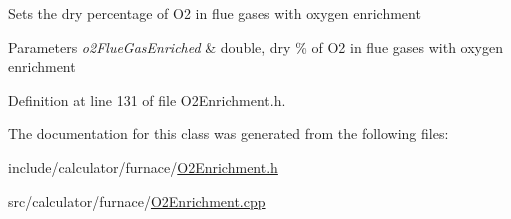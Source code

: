 Sets the dry percentage of O2 in flue gases with oxygen enrichment 
\begin{DoxyParams}{Parameters}
{\em o2\+Flue\+Gas\+Enriched} & double, dry \% of O2 in flue gases with oxygen enrichment \\
\hline
\end{DoxyParams}


Definition at line 131 of file O2\+Enrichment.\+h.



The documentation for this class was generated from the following files\+:\begin{DoxyCompactItemize}
\item 
include/calculator/furnace/\hyperlink{_o2_enrichment_8h}{O2\+Enrichment.\+h}\item 
src/calculator/furnace/\hyperlink{_o2_enrichment_8cpp}{O2\+Enrichment.\+cpp}\end{DoxyCompactItemize}
